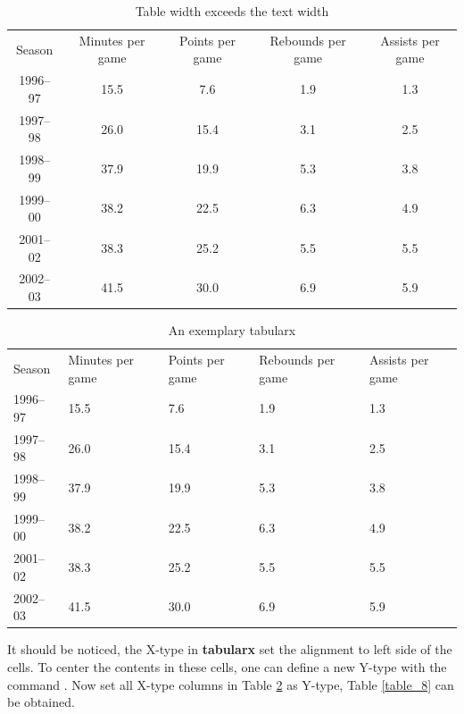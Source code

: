 	\begin{table}[h!]
		\centering
		\begin{tabular}{| c  c  c  c  c |}
			\rowcolor{lal-p!60}
			\hline
			Season  & Minutes per game  & Points per game  & Rebounds per game & Assists per game \\
			1996–97 & 15.5 & 7.6  & 1.9 & 1.3 \\
			1997–98	& 26.0 & 15.4 &	3.1	& 2.5 \\
			1998–99	& 37.9 & 19.9 &	5.3 & 3.8 \\
			1999–00	& 38.2 & 22.5 &	6.3	& 4.9 \\
			2001–02 & 38.3 & 25.2 &	5.5	& 5.5 \\
			2002–03 & 41.5 & 30.0 & 6.9 & 5.9 \\
			\hline
		\end{tabular}
		\caption{Table width exceeds the text width}
		\label{table_6}
	\end{table}  
	
	\begin{table}
		\centering
		\begin{tabularx}{0.9\textwidth}{| X | X | X | X | X |}
			\rowcolor{lal-p!60}
			\hline
			Season  & Minutes per game  & Points per game  & Rebounds per game & Assists per game \\
			1996–97 & 15.5 & 7.6  & 1.9 & 1.3 \\
			1997–98	& 26.0 & 15.4 &	3.1	& 2.5 \\
			1998–99	& 37.9 & 19.9 &	5.3 & 3.8 \\
			1999–00	& 38.2 & 22.5 &	6.3	& 4.9 \\
			2001–02 & 38.3 & 25.2 &	5.5	& 5.5 \\
			2002–03 & 41.5 & 30.0 & 6.9 & 5.9 \\
			\hline
		\end{tabularx}
		\caption{An exemplary tabularx}
		\label{table_7}
	\end{table}

	It should be noticed, the X-type in {\color{blue}\textbf{tabularx}} set the alignment to left side of the cells. To center the contents in these cells, one can define a new Y-type with the command {}. Now set all X-type columns in Table \ref{table_7} as Y-type, Table \ref{table_8} can be obtained.
	

